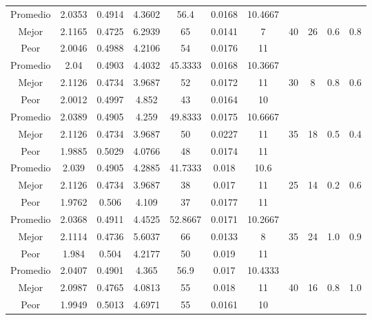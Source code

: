 \begin{table}[h!]
\begin{center}
\begin{tabular}{|c|c|c|c|c|c|c|c|c|c|c|}
        \hline
        \hline
            Promedio  & 2.0353 & 0.4914 & 4.3602 & 56.4 & 0.0168 & 10.4667 &  &  &  & \\
            \cline{1-7}
            Mejor & 2.1165 & 0.4725  & 6.2939 & 65 & 0.0141 & 7 & 40 & 26 & 0.6 & 0.8\\
            \cline{1-7}
            Peor & 2.0046 & 0.4988  & 4.2106 & 54 & 0.0176 & 11 &  &  &  & \\
        \hline
        \hline
            Promedio  & 2.04 & 0.4903 & 4.4032 & 45.3333 & 0.0168 & 10.3667 &  &  &  & \\
            \cline{1-7}
            Mejor & 2.1126 & 0.4734  & 3.9687 & 52 & 0.0172 & 11 & 30 & 8 & 0.8 & 0.6\\
            \cline{1-7}
            Peor & 2.0012 & 0.4997  & 4.852 & 43 & 0.0164 & 10 &  &  &  & \\
        \hline
        \hline
            Promedio  & 2.0389 & 0.4905 & 4.259 & 49.8333 & 0.0175 & 10.6667 &  &  &  & \\
            \cline{1-7}
            Mejor & 2.1126 & 0.4734  & 3.9687 & 50 & 0.0227 & 11 & 35 & 18 & 0.5 & 0.4\\
            \cline{1-7}
            Peor & 1.9885 & 0.5029  & 4.0766 & 48 & 0.0174 & 11 &  &  &  & \\
        \hline
        \hline
            Promedio  & 2.039 & 0.4905 & 4.2885 & 41.7333 & 0.018 & 10.6 &  &  &  & \\
            \cline{1-7}
            Mejor & 2.1126 & 0.4734  & 3.9687 & 38 & 0.017 & 11 & 25 & 14 & 0.2 & 0.6\\
            \cline{1-7}
            Peor & 1.9762 & 0.506  & 4.109 & 37 & 0.0177 & 11 &  &  &  & \\
        \hline
        \hline
            Promedio  & 2.0368 & 0.4911 & 4.4525 & 52.8667 & 0.0171 & 10.2667 &  &  &  & \\
            \cline{1-7}
            Mejor & 2.1114 & 0.4736  & 5.6037 & 66 & 0.0133 & 8 & 35 & 24 & 1.0 & 0.9\\
            \cline{1-7}
            Peor & 1.984 & 0.504  & 4.2177 & 50 & 0.019 & 11 &  &  &  & \\
        \hline
        \hline
            Promedio  & 2.0407 & 0.4901 & 4.365 & 56.9 & 0.017 & 10.4333 &  &  &  & \\
            \cline{1-7}
            Mejor & 2.0987 & 0.4765  & 4.0813 & 55 & 0.018 & 11 & 40 & 16 & 0.8 & 1.0\\
            \cline{1-7}
            Peor & 1.9949 & 0.5013  & 4.6971 & 55 & 0.0161 & 10 &  &  &  & \\

\end{tabular}
\end{center}
\end{table}

